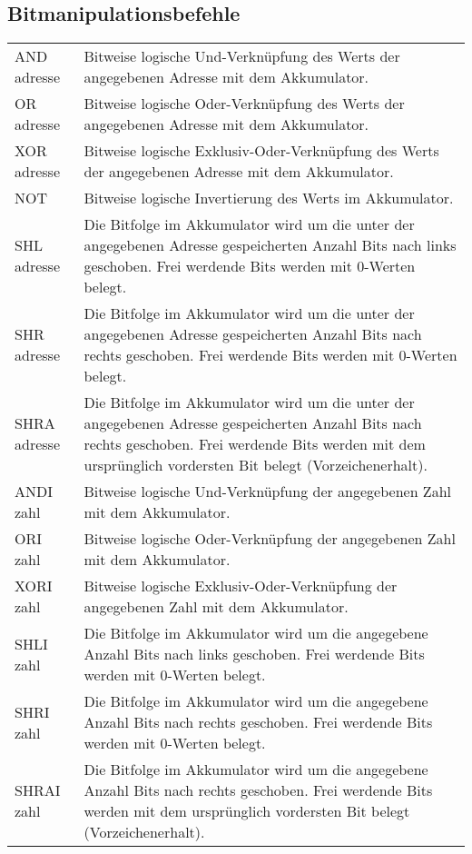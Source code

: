 \documentclass{lehramt-informatik-haupt}
\begin{document}
%

\subsection{Bitmanipulationsbefehle}

\begin{tabularx}{\linewidth}{lX}
AND adresse & Bitweise logische Und-Verknüpfung des Werts der angegebenen Adresse mit dem Akkumulator. \\
OR adresse & Bitweise logische Oder-Verknüpfung des Werts der angegebenen Adresse mit dem Akkumulator. \\
XOR adresse & Bitweise logische Exklusiv-Oder-Verknüpfung des Werts der angegebenen Adresse mit dem Akkumulator. \\
NOT & Bitweise logische Invertierung des Werts im Akkumulator. \\
SHL adresse & Die Bitfolge im Akkumulator wird um die unter der angegebenen Adresse gespeicherten Anzahl Bits nach links geschoben. Frei werdende Bits werden mit 0-Werten belegt. \\
SHR adresse & Die Bitfolge im Akkumulator wird um die unter der angegebenen Adresse gespeicherten Anzahl Bits nach rechts geschoben. Frei werdende Bits werden mit 0-Werten belegt. \\
SHRA adresse & Die Bitfolge im Akkumulator wird um die unter der angegebenen Adresse gespeicherten Anzahl Bits nach rechts geschoben. Frei werdende Bits werden mit dem ursprünglich vordersten Bit belegt (Vorzeichenerhalt). \\
ANDI zahl & Bitweise logische Und-Verknüpfung der angegebenen Zahl mit dem Akkumulator. \\
ORI zahl & Bitweise logische Oder-Verknüpfung der angegebenen Zahl mit dem Akkumulator. \\
XORI zahl & Bitweise logische Exklusiv-Oder-Verknüpfung der angegebenen Zahl mit dem Akkumulator. \\
SHLI zahl & Die Bitfolge im Akkumulator wird um die angegebene Anzahl Bits nach links geschoben. Frei werdende Bits werden mit 0-Werten belegt. \\
SHRI zahl & Die Bitfolge im Akkumulator wird um die angegebene Anzahl Bits nach rechts geschoben. Frei werdende Bits werden mit 0-Werten belegt. \\
SHRAI zahl & Die Bitfolge im Akkumulator wird um die angegebene Anzahl Bits nach rechts geschoben. Frei werdende Bits werden mit dem ursprünglich vordersten Bit belegt (Vorzeichenerhalt). \\
\end{tabularx}
\end{document}

